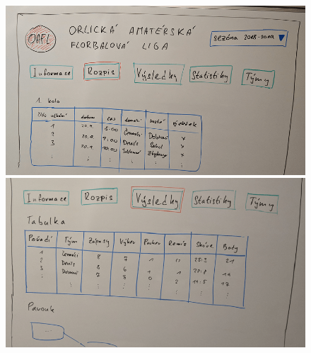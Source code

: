 \documentclass[11pt, a4paper, titlepage]{article}
\begin{document}
\begin{figure}[htp]
\centering
    \begin{minipage}{.5\textwidth}
        \centering
        \includegraphics[width=.98\textwidth]{images/draft-03.png}
    \end{minipage}%
    \begin{minipage}{.5\textwidth}
        \centering
        \includegraphics[width=.98\textwidth]{images/draft-04.png}
    \end{minipage}
\end{figure}
\end{document}
